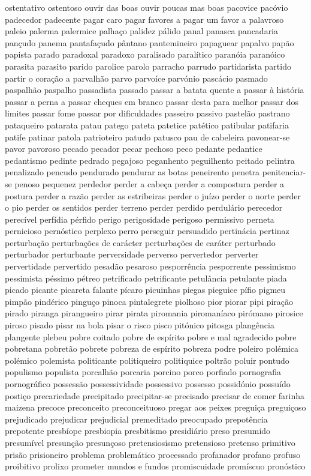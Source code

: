 ostentativo ostentoso ouvir das boas ouvir poucas mas boas pacovice pac\'{o}vio padecedor padecente pagar caro pagar favores a pagar um favor a palavroso paleio palerma palermice palha\c{c}o palidez p\'{a}lido panal panasca pancadaria pan\c{c}udo panema pantafa\c{c}udo p\^{a}ntano pantemineiro papaguear papalvo pap\~ao papista parado paradoxal paradoxo paralisado paral\'{i}tico paran\'{o}ia paran\'{o}ico parasita parasito parido parolice parolo parracho parrudo partidarista partido partir o cora\c{c}\~ao a parvalh\~ao parvo parvo\'{i}ce parv\'{o}nio pasc\'{a}cio pasmado paspalh\~ao paspalho passadista passado passar a batata quente a passar \`{a} hist\'{o}ria passar a perna a passar cheques em branco passar desta para melhor passar dos limites passar fome passar por dificuldades passeiro passivo pastel\~ao pastrano pataqueiro patarata patau patego pateta patetice pat\'{e}tico patibular patifaria patife patinar patola patrioteiro patudo patusco pau de cabeleira pavonear-se pavor pavoroso pecado pecador pecar pechoso peco pedante pedantice pedantismo pedinte pedrado pegajoso peganhento peguilhento peitado pelintra penalizado pencudo pendurado pendurar as botas peneirento penetra penitenciar-se penoso pequenez perdedor perder a cabe\c{c}a perder a compostura perder a postura perder a raz\~ao perder as estribeiras perder o ju\'{i}zo perder o norte perder o pio perder os sentidos perder terreno perder perdido perdul\'{a}rio perecedor perec\'{i}vel perf\'{i}dia p\'{e}rfido perigo perigosidade perigoso permissivo perneta pernicioso pern\'{o}stico perplexo perro perseguir persuadido pertin\'{a}cia pertinaz perturba\c{c}\~ao perturba\c{c}\~oes de car\'{a}cter perturba\c{c}\~oes de car\'{a}ter perturbado perturbador perturbante perversidade perverso pervertedor perverter pervertidade pervertido pesad\~ao pesaroso pesporr\^{e}ncia pesporrente pessimismo pessimista p\'{e}ssimo p\'{e}treo petrificado petrificante petul\^{a}ncia petulante piada picado picante picareta falante p\'{i}caro picuinhas piegas pieguice p\'{i}fio pigmeu pimp\~ao pind\'{e}rico pingu\c{c}o pinoca pintalegrete piolhoso pior piorar pipi pira\c{c}\~ao pirado piranga pirangueiro pirar pirata piromania piroman\'{i}aco pir\'{o}mano pirosice piroso pisado pisar na bola pisar o risco pisco pit\'{o}nico pitosga plang\^{e}ncia plangente plebeu pobre coitado pobre de esp\'{i}rito pobre e mal agradecido pobre pobretana pobret\~ao pobrete pobreza de esp\'{i}rito pobreza podre poleiro pol\'{e}mica pol\'{e}mico polemista politicante politiqueiro politiquice poltr\~ao poluir pontudo populismo populista porcalh\~ao porcaria porcino porco porfiado pornografia pornogr\'{a}fico possess\~ao possessividade possessivo possesso possid\'{o}nio possu\'{i}do posti\c{c}o precariedade precipitado precipitar-se precisado precisar de comer farinha maizena precoce preconceito preconceituoso pregar aos peixes pregui\c{c}a pregui\c{c}oso prejudicado prejudicar prejudicial premeditado preocupado prepot\^{e}ncia prepotente presb\'{i}ope presbiopia presbitismo presidi\'{a}rio preso presumido presum\'{i}vel presun\c{c}\~ao presun\c{c}oso pretensiosismo pretensioso pretenso primitivo pris\~ao prisioneiro problema problem\'{a}tico processado profanador profano profuso proibitivo prolixo prometer mundos e fundos promiscuidade prom\'{i}scuo pron\'{o}stico 